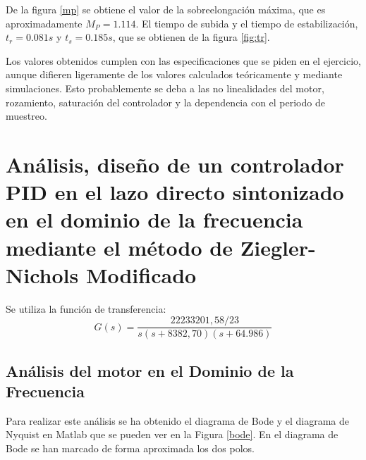 \documentclass[a4paper]{article}
\begin{document}
De la figura \ref{mp} se obtiene el valor de la sobreelongación máxima, que es aproximadamente $M_P=1.114$. El tiempo de subida y el tiempo de estabilización, $t_r=0.081 s$ y $t_s=0.185 s$, que se obtienen de la figura \ref{fig:tr}.

Los valores obtenidos cumplen con las especificaciones que se piden en el ejercicio, aunque difieren ligeramente de los valores calculados teóricamente y mediante simulaciones. Esto probablemente se deba a las no linealidades del motor, rozamiento, saturación del controlador y la dependencia con el periodo de muestreo.

\section{Análisis, diseño de un controlador PID en el lazo directo sintonizado en el dominio de la frecuencia mediante el método de Ziegler-Nichols Modificado}
Se utiliza la función de transferencia:
\begin{equation}
G(s)=\frac{22233201,58/23}{s(s+8382,70)(s+64.986)}
\end{equation}
\subsection{Análisis del motor en el Dominio de la Frecuencia}
Para realizar este análisis se ha obtenido el diagrama de Bode y el diagrama de Nyquist en Matlab que se pueden ver en la Figura \ref{bode}. En el diagrama de Bode se han marcado de forma aproximada los dos polos.
\end{document}
